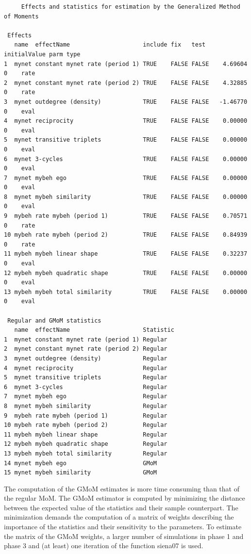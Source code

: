 \documentclass[a4paper,fleqn,11pt]{article}
\newcommand{\+}{\, + \,}
\newcommand{\sfn}[1]{\textsf{#1}}
\begin{document}
{\footnotesize
\begin{verbatim}
	 Effects and statistics for estimation by the Generalized Method of Moments

 Effects
   name  effectName                     include fix   test  initialValue parm type
1  mynet constant mynet rate (period 1) TRUE    FALSE FALSE    4.69604   0    rate
2  mynet constant mynet rate (period 2) TRUE    FALSE FALSE    4.32885   0    rate
3  mynet outdegree (density)            TRUE    FALSE FALSE   -1.46770   0    eval
4  mynet reciprocity                    TRUE    FALSE FALSE    0.00000   0    eval
5  mynet transitive triplets            TRUE    FALSE FALSE    0.00000   0    eval
6  mynet 3-cycles                       TRUE    FALSE FALSE    0.00000   0    eval
7  mynet mybeh ego                      TRUE    FALSE FALSE    0.00000   0    eval
8  mynet mybeh similarity               TRUE    FALSE FALSE    0.00000   0    eval
9  mybeh rate mybeh (period 1)          TRUE    FALSE FALSE    0.70571   0    rate
10 mybeh rate mybeh (period 2)          TRUE    FALSE FALSE    0.84939   0    rate
11 mybeh mybeh linear shape             TRUE    FALSE FALSE    0.32237   0    eval
12 mybeh mybeh quadratic shape          TRUE    FALSE FALSE    0.00000   0    eval
13 mybeh mybeh total similarity         TRUE    FALSE FALSE    0.00000   0    eval

 Regular and GMoM statistics
   name  effectName                     Statistic
1  mynet constant mynet rate (period 1) Regular
2  mynet constant mynet rate (period 2) Regular
3  mynet outdegree (density)            Regular
4  mynet reciprocity                    Regular
5  mynet transitive triplets            Regular
6  mynet 3-cycles                       Regular
7  mynet mybeh ego                      Regular
8  mynet mybeh similarity               Regular
9  mybeh rate mybeh (period 1)          Regular
10 mybeh rate mybeh (period 2)          Regular
11 mybeh mybeh linear shape             Regular
12 mybeh mybeh quadratic shape          Regular
13 mybeh mybeh total similarity         Regular
14 mynet mybeh ego                      GMoM
15 mynet mybeh similarity               GMoM
\end{verbatim}}

\normalsize

The computation of the GMoM estimates is more time consuming than that of the regular MoM.
The GMoM estimator is computed by minimizing the distance between the
expected value of the statistics and their sample counterpart.
The minimization demands the computation of a matrix of weights
describing the importance of the statistics and their sensitivity
to the parameters. To estimate the matrix of the GMoM weights, a larger number of simulations
in phase 1 and phase 3 and (at least) one iteration of the function \sfn{siena07} is used.
\end{document}
